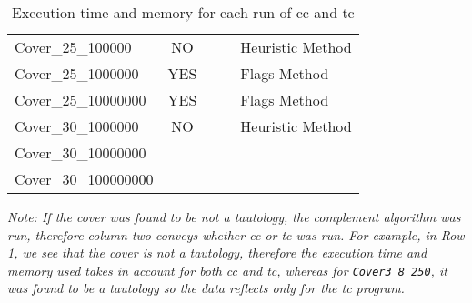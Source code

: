 \documentclass[10pt]{article}
\begin{document}
\begin{table}[H]
\begin{tabular}{l|c|c|c|l}
            Cover\_25\_100000       & NO                      &                                  &                      & Heuristic Method \\
            Cover\_25\_1000000      & YES                     &                                  &                      & Flags Method     \\
            Cover\_25\_10000000     & YES                     &                                  &                      & Flags Method     \\
            Cover\_30\_1000000      & NO                      &                                  &                      & Heuristic Method \\
            Cover\_30\_10000000     &                         &                                  &                      & \\
            Cover\_30\_100000000    &                         &                                  &                      & \\
            \bottomrule
        \end{tabular}
        \caption{Execution time and memory for each run of cc and tc}
    \end{table}

    \textit{Note: If the cover was found to be not a tautology, the
        complement algorithm was run, therefore column two conveys whether
        cc or tc was run. For example, in Row 1, we see that the cover is
        not a tautology, therefore the execution time and memory used takes
        in account for both cc and tc, whereas for \texttt{Cover3\_8\_250},
        it was found to be a tautology so the data reflects only for the tc
        program.}
\end{document}
